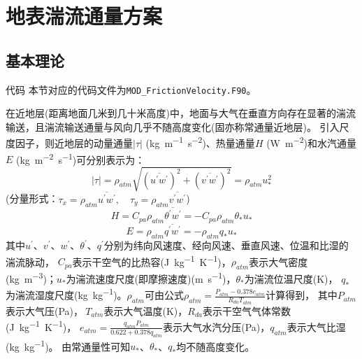 \chapter{地表湍流通量方案}\label{ch:地表湍流通量}

\section{基本理论}\label{基本理论}
\begin{mymdframed}{代码}
本节对应的代码文件为\texttt{MOD\_FrictionVelocity.F90}。
\end{mymdframed}

在近地层(距离地面几米到几十米高度)中，地面与大气在垂直方向存在显著的湍流输送，且湍流输送通量与风向几乎不随高度变化(固亦称常通量近地层)。
引入尺度因子，则近地层的动量通量$\left|\tau\right|$ (\unit{kg.m^{-1}.s^{-2}})、热量通量$H$ (\unit{W.m^{-2}})和水汽通量$E$ (\unit{kg.m^{-2}.s^{-1}})可分别表示为：
\begin{equation}
|\tau|=\rho_{atm} \sqrt{ \left(\overline{u^{\prime} w^{\prime}}\right)^{2} + \left(\overline{v^{\prime} w^{\prime}}\right)^{2} }=\rho_{atm} u_{*}^{2}
\end{equation}
(分量形式：$\tau_{x}=\rho_{atm} \overline{u^{\prime} w^{\prime}}, \quad \tau_{y}=\rho_{atm} \overline{v^{\prime} w^{\prime}}$)
\begin{equation}
H=C_{p a} \rho_{atm} \overline{\theta^{\prime} w^{\prime}}=-C_{p a} \rho_{atm} \theta_{*} u_{*}
\end{equation}
\begin{equation}
E=\rho_{atm} \overline{q^{\prime} w^{\prime}}=-\rho_{atm} q_{*} u_{*}
\end{equation}
其中$u^\prime$、$v^\prime$、$w^\prime$、$\theta^\prime$、$q^\prime$分别为纬向风速度、经向风速、垂直风速、位温和比湿的湍流脉动，
$C_{pa}$表示干空气的比热容(\unit{J.kg^{-1}.K^{-1}})，$\rho_{atm}$表示大气密度(\unit{kg.m^{-3}})；$u_\ast$为湍流速度尺度(即摩擦速度)(\unit{m.s^{-1}})，$\theta_\ast$为湍流位温尺度(K)，
$q_\ast$为湍流湿度尺度(\unit{kg.kg^{-1}})。$\rho_{atm}$可由公式$\rho_{atm}=\frac{P_{atm}-0.378e_{atm}}{R_{da}T_{atm}}$计算得到，
其中$P_{atm}$表示大气压(Pa)，$\ T_{atm}$表示大气温度(K)，$R_{da}$表示干空气气体常数(\unit{J.kg^{-1}.K^{-1}})，
$e_{atm}=\frac{q_{atm}P_{atm}}{0.622+0.378q_{atm}}$表示大气水汽分压(Pa)，$q_{atm}$表示大气比湿(\unit{kg.kg^{-1}})。
由常通量性可知$u_\ast$、$\theta_\ast$、$q_\ast$均不随高度变化。


